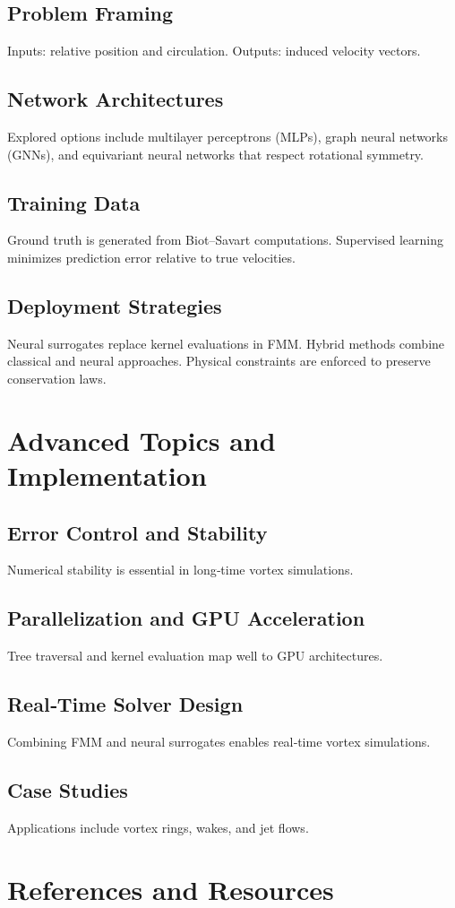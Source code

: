 \documentclass[conf]{new-aiaa} %
\begin{document}
\subsection{Problem Framing}
Inputs: relative position and circulation.  
Outputs: induced velocity vectors.

\subsection{Network Architectures}
Explored options include multilayer perceptrons (MLPs), graph neural networks (GNNs), and equivariant neural networks that respect rotational symmetry.

\subsection{Training Data}
Ground truth is generated from Biot--Savart computations.  
Supervised learning minimizes prediction error relative to true velocities.

\subsection{Deployment Strategies}
Neural surrogates replace kernel evaluations in FMM.  
Hybrid methods combine classical and neural approaches.  
Physical constraints are enforced to preserve conservation laws.

\section{Advanced Topics and Implementation}

\subsection{Error Control and Stability}
Numerical stability is essential in long‐time vortex simulations.

\subsection{Parallelization and GPU Acceleration}
Tree traversal and kernel evaluation map well to GPU architectures.

\subsection{Real‐Time Solver Design}
Combining FMM and neural surrogates enables real‐time vortex simulations.

\subsection{Case Studies}
Applications include vortex rings, wakes, and jet flows.

\section{References and Resources}

% 
% 
\end{document}
